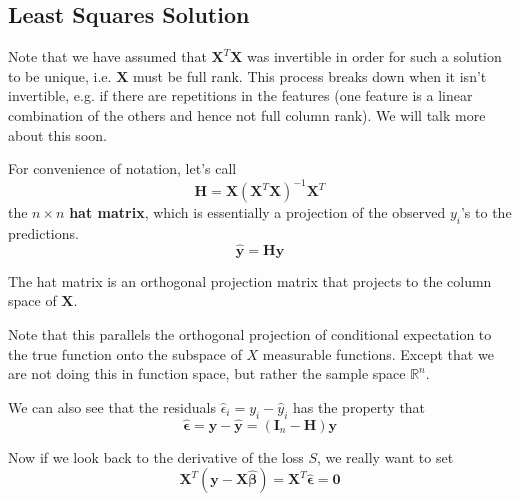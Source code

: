 \subsection{Least Squares Solution} 

  Note that we have assumed that $\mathbf{X}^T \mathbf{X}$ was invertible in order for such a solution to be unique, i.e. $\mathbf{X}$ must be full rank. This process breaks down when it isn't invertible, e.g. if there are repetitions in the features (one feature is a linear combination of the others and hence not full column rank). We will talk more about this soon. 

  \begin{definition}
    For convenience of notation, let's call 
    \begin{equation}
      \mathbf{H} = \mathbf{X} (\mathbf{X}^T \mathbf{X})^{-1} \mathbf{X}^T 
    \end{equation}
    the $n \times n$ \textbf{hat matrix}, which is essentially a projection of the observed $y_i$'s to the predictions. 
    \begin{equation}
      \hat{\mathbf{y}} = \mathbf{H} \mathbf{y}
    \end{equation}
  \end{definition}

  \begin{lemma}[Properties]
    The hat matrix is an orthogonal projection matrix that projects to the column space of $\mathbf{X}$. 
  \end{lemma}

  Note that this parallels the orthogonal projection of conditional expectation to the true function onto the subspace of $X$ measurable functions. Except that we are not doing this in function space, but rather the sample space $\mathbb{R}^n$. 

  We can also see that the residuals $\hat{\epsilon}_i = y_i - \hat{y}_i$ has the property that 
  \begin{equation}
    \hat{\boldsymbol{\epsilon}} = \mathbf{y} - \hat{\mathbf{y}} = (\mathbf{I}_n - \mathbf{H}) \mathbf{y} 
  \end{equation}

  Now if we look back to the derivative of the loss $S$, we really want to set 
  \begin{equation}
    \mathbf{X}^T (\mathbf{y} - \mathbf{X} \hat{\boldsymbol{\beta}}) = \mathbf{X}^T \hat{\boldsymbol{\epsilon}} = \mathbf{0}
  \end{equation}
  
